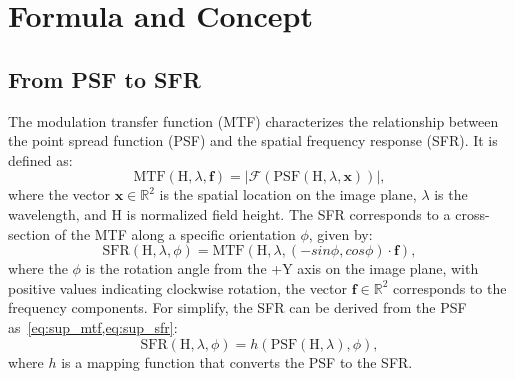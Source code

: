 \clearpage

\appendix
\renewcommand\thefigure{A\arabic{figure}}
\renewcommand\thetable{A\arabic{table}}  
\renewcommand\theequation{A\arabic{equation}}
\setcounter{section}{0}
\setcounter{equation}{0}
\setcounter{table}{0}
\setcounter{figure}{0}

\setcounter{page}{1}
\maketitlesupplementary


\section{Formula and Concept}



\subsection{From PSF to SFR}

The modulation transfer function (MTF) characterizes the relationship between the point spread function (PSF) and the spatial frequency response (SFR). It is defined as:
\begin{equation}\label{eq:sup_mtf}
\mbox{MTF}(\mathrm{H},\lambda,\mathbf{f}) = |\mathcal{F} (\mbox{PSF}(\mathrm{H},\lambda,\mathbf{x}))|,
\end{equation}
where the vector $\mathbf{x} \in \mathbb{R}^2$ is the spatial location on the image plane, $\lambda$ is the wavelength, and $\mathrm{H}$ is normalized field height. The SFR corresponds to a cross-section of the MTF along a specific orientation $\phi$, given by: 
\begin{equation}\label{eq:sup_sfr}
\mbox{SFR}(\mathrm{H},\lambda,\phi) = \mbox{MTF}(\mathrm{H},\lambda,(-sin\phi,cos\phi) \cdot\mathbf{f}),
\end{equation}
where the $\phi$ is the rotation angle from the +Y axis on the image plane, with positive values indicating clockwise rotation, the vector $\mathbf{f} \in \mathbb{R}^2$ corresponds to the frequency components. For simplify, the SFR can be derived from the PSF as~\cref{eq:sup_mtf,eq:sup_sfr}:
\begin{equation}\label{eq:sup_sfr1}
\mbox{SFR}(\mathrm{H},\lambda,\phi) = h(\mbox{PSF}(\mathrm{H},\lambda),\phi),
\end{equation}
where $h$ is a mapping function that converts the PSF to the SFR.

